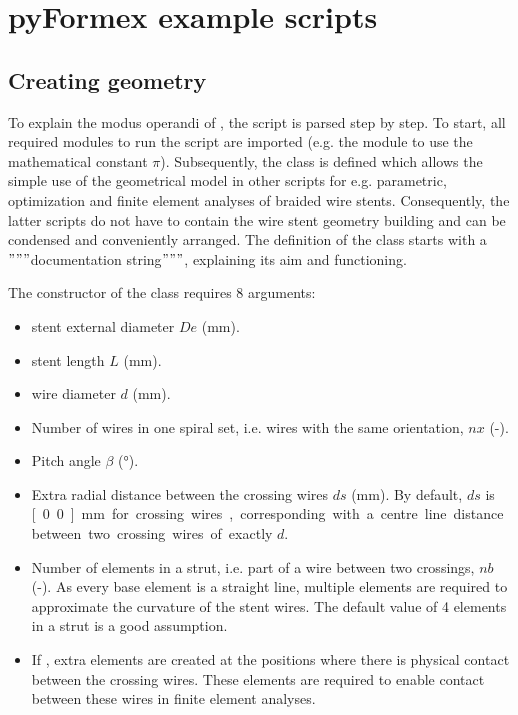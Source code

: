 
\chapter{pyFormex example scripts}
\label{cha:examples}

\section{Creating geometry}
\label{sec:creating-geometry}

To explain the modus operandi of \pyf, the  script is parsed step by step. To start, all required modules to run the  script are imported (e.g. the  module to use the mathematical constant $\pi$). Subsequently, the class  is defined which allows the simple use of the geometrical model in other scripts for e.g. parametric, optimization and finite element analyses of braided wire stents. Consequently, the latter scripts do not have to contain the wire stent geometry building and can be condensed and conveniently arranged. The definition of the class starts with a $"""$documentation string$"""$, explaining its aim and functioning.



The constructor  of the  class requires 8 arguments:
\begin{itemize}
\item stent external diameter $De$ (\unit{mm}).
\item stent length $L$ (\unit{mm}).
\item wire diameter $d$ (\unit{mm}).
\item Number of wires in one spiral set, i.e. wires with the same orientation, $nx$ (\unit{-}).
\item Pitch angle $\beta$ (\unit{°}).
\item Extra radial distance between the crossing wires $ds$ (\unit{mm}). By default, $ds$ is \unit[0.0]{mm} for crossing wires, corresponding with a centre line distance between two crossing wires of exactly $d$.
\item Number of elements in a strut, i.e. part of a wire between two crossings, $nb$ (\unit{-}). As every base element is a straight line, multiple elements are required to approximate the curvature of the stent wires. The default value of 4 elements in a strut is a good assumption.
\item If , extra elements are created at the positions where there is physical contact between the crossing wires. These elements are required to enable contact between these wires in finite element analyses.
\end{itemize}

